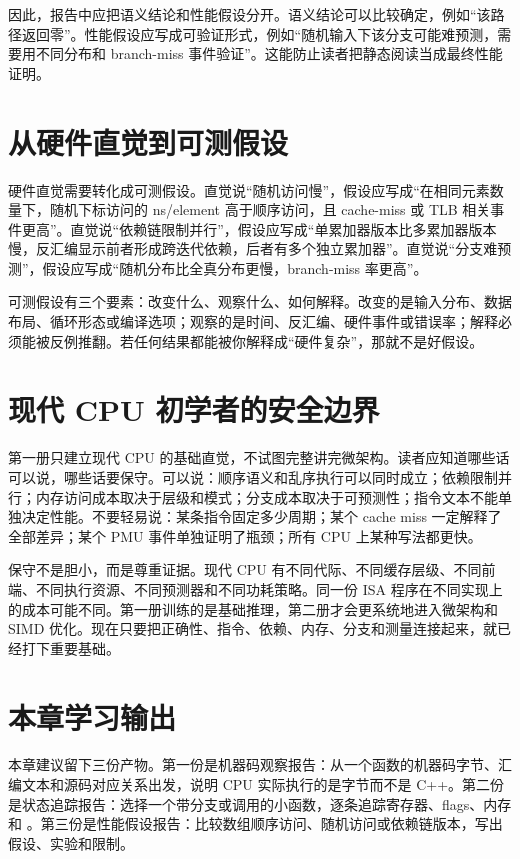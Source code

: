 因此，报告中应把语义结论和性能假设分开。语义结论可以比较确定，例如“该路径返回零”。性能假设应写成可验证形式，例如“随机输入下该分支可能难预测，需要用不同分布和 branch-miss 事件验证”。这能防止读者把静态阅读当成最终性能证明。

\section{从硬件直觉到可测假设}

硬件直觉需要转化成可测假设。直觉说“随机访问慢”，假设应写成“在相同元素数量下，随机下标访问的 ns/element 高于顺序访问，且 cache-miss 或 TLB 相关事件更高”。直觉说“依赖链限制并行”，假设应写成“单累加器版本比多累加器版本慢，反汇编显示前者形成跨迭代依赖，后者有多个独立累加器”。直觉说“分支难预测”，假设应写成“随机分布比全真分布更慢，branch-miss 率更高”。

可测假设有三个要素：改变什么、观察什么、如何解释。改变的是输入分布、数据布局、循环形态或编译选项；观察的是时间、反汇编、硬件事件或错误率；解释必须能被反例推翻。若任何结果都能被你解释成“硬件复杂”，那就不是好假设。

\section{现代 CPU 初学者的安全边界}

第一册只建立现代 CPU 的基础直觉，不试图完整讲完微架构。读者应知道哪些话可以说，哪些话要保守。可以说：顺序语义和乱序执行可以同时成立；依赖限制并行；内存访问成本取决于层级和模式；分支成本取决于可预测性；指令文本不能单独决定性能。不要轻易说：某条指令固定多少周期；某个 cache miss 一定解释了全部差异；某个 PMU 事件单独证明了瓶颈；所有 CPU 上某种写法都更快。

保守不是胆小，而是尊重证据。现代 CPU 有不同代际、不同缓存层级、不同前端、不同执行资源、不同预测器和不同功耗策略。同一份 ISA 程序在不同实现上的成本可能不同。第一册训练的是基础推理，第二册才会更系统地进入微架构和 SIMD 优化。现在只要把正确性、指令、依赖、内存、分支和测量连接起来，就已经打下重要基础。

\section{本章学习输出}

本章建议留下三份产物。第一份是机器码观察报告：从一个函数的机器码字节、汇编文本和源码对应关系出发，说明 CPU 实际执行的是字节而不是 C++。第二份是状态追踪报告：选择一个带分支或调用的小函数，逐条追踪寄存器、flags、内存和 。第三份是性能假设报告：比较数组顺序访问、随机访问或依赖链版本，写出假设、实验和限制。

